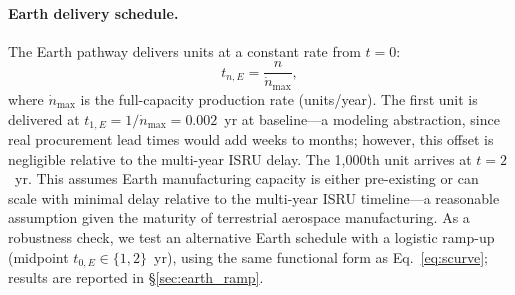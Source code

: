 \documentclass[preprint,12pt]{elsarticle}
\begin{document}
\paragraph{Earth delivery schedule.} The Earth pathway delivers units at a constant rate from $t = 0$:
\begin{equation}
  t_{n,E} = \frac{n}{\dot{n}_{\max}},
  \label{eq:earth_schedule}
\end{equation}
where $\dot{n}_{\max}$ is the full-capacity production rate (units/year). The first unit is delivered at $t_{1,E} = 1/\dot{n}_{\max} = 0.002$~yr at baseline---a modeling abstraction, since real procurement lead times would add weeks to months; however, this offset is negligible relative to the multi-year ISRU delay. The 1{,}000th unit arrives at $t = 2$~yr. This assumes Earth manufacturing capacity is either pre-existing or can scale with minimal delay relative to the multi-year ISRU timeline---a reasonable assumption given the maturity of terrestrial aerospace manufacturing. As a robustness check, we test an alternative Earth schedule with a logistic ramp-up (midpoint $t_{0,E} \in \{1, 2\}$~yr), using the same functional form as Eq.~\ref{eq:scurve}; results are reported in \S\ref{sec:earth_ramp}.
\end{document}
